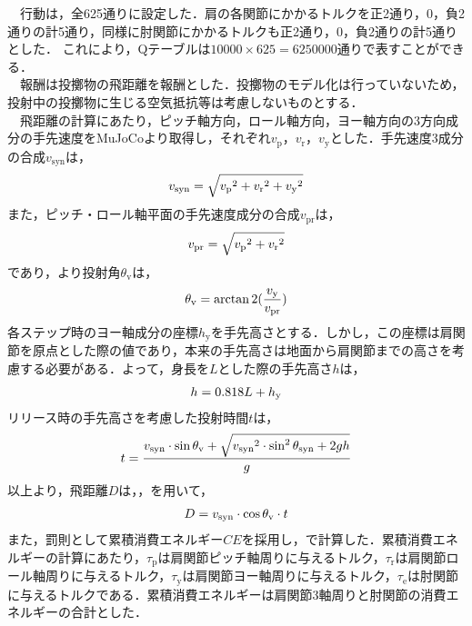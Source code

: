 　行動は，全625通りに設定した．肩の各関節にかかるトルクを正2通り，0，負2通りの計5通り，同様に肘関節にかかるトルクも正2通り，0，負2通りの計5通りとした．
これにより，Qテーブルは$10000 \times 625=6250000$通りで表すことができる．\\
　報酬は投擲物の飛距離を報酬とした．投擲物のモデル化は行っていないため，投射中の投擲物に生じる空気抵抗等は考慮しないものとする．\\
　飛距離の計算にあたり，ピッチ軸方向，ロール軸方向，ヨー軸方向の3方向成分の手先速度をMuJoCoより取得し，それぞれ$v_{\mathrm{p}}$，$v_{\mathrm{r}}$，$v_{\mathrm{y}}$とした．手先速度3成分の合成$v_{\mathrm{syn}}$は，
\begin{eqnarray}
  \equlabel{3}
  v_{\mathrm{syn}} = \sqrt{{v_{\mathrm{p}}}^{2} + {v_{\mathrm{r}}}^{2} + {v_{\mathrm{y}}}^{2}}
\end{eqnarray}
また，ピッチ・ロール軸平面の手先速度成分の合成$v_{\mathrm{pr}}$は，
\begin{eqnarray}
  \equlabel{4}
  v_{\mathrm{pr}} = \sqrt{{v_{\mathrm{p}}}^{2} + {v_{\mathrm{r}}}^{2}}
\end{eqnarray}
であり，より投射角$\theta_{\mathrm{v}}$は，
\begin{eqnarray}
  \equlabel{5}
  \theta_{\mathrm{v}} = \arctan2(\frac{v_{\mathrm{y}}}{v_{\mathrm{pr}}})
\end{eqnarray}
各ステップ時のヨー軸成分の座標$h_{\mathrm{y}}$を手先高さとする．しかし，この座標は肩関節を原点とした際の値であり，本来の手先高さは地面から肩関節までの高さを考慮する必要がある．よって，身長を$L$とした際の手先高さ$h$は，
\begin{eqnarray}
  \equlabel{6}
  h = 0.818L + h_{\mathrm{y}}
\end{eqnarray}
リリース時の手先高さを考慮した投射時間$t$は，
\begin{eqnarray}
  \equlabel{7}
  t = \frac{v_{\mathrm{syn}}\cdot\sin\theta_{\mathrm{v}} + \sqrt{{v_{\mathrm{syn}}}^2\cdot\sin^2\theta_{\mathrm{syn}} + 2gh}}{g}
\end{eqnarray}
以上より，飛距離$D$は，，を用いて，
\begin{eqnarray}
  \equlabel{8}
  D = v_{\mathrm{syn}} \cdot \cos\theta_{\mathrm{v}} \cdot t
\end{eqnarray}
また，罰則として累積消費エネルギー$CE$を採用し，で計算した．累積消費エネルギーの計算にあたり，$\tau_{\mathrm{p}}$は肩関節ピッチ軸周りに与えるトルク，$\tau_{\mathrm{r}}$は肩関節ロール軸周りに与えるトルク，$\tau_{\mathrm{y}}$は肩関節ヨー軸周りに与えるトルク，$\tau_{\mathrm{e}}$は肘関節に与えるトルクである．累積消費エネルギーは肩関節3軸周りと肘関節の消費エネルギーの合計とした．
